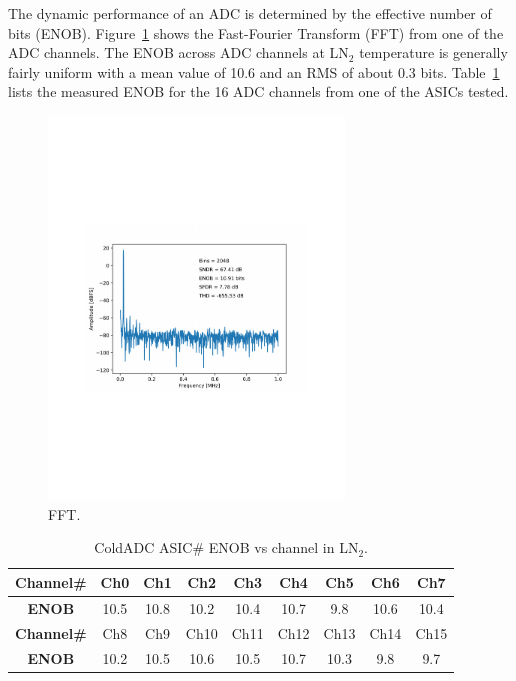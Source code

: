 \label{sec:4.3}


The dynamic performance of an ADC is determined by the effective number of bits (ENOB). Figure~\ref{fig:coldadc_fft} shows the Fast-Fourier Transform (FFT) from one of the ADC channels.  The ENOB across ADC channels at LN$_2$ temperature is generally fairly uniform with a mean value of 10.6 and an RMS of about 0.3 bits. Table~\ref{tab:adc_enob} lists the measured ENOB for the 16 ADC channels from one of the ASICs tested.
\begin{figure}[htb]
\centering
\begin{center}
\includegraphics[width=0.7\textwidth]{figures/fft_Sinusoid_20KHz_SE-SHA-ADC0_NomVREFPN_2M_v1.pdf}
\end{center}
\caption{FFT.}
\label{fig:coldadc_fft}
\end{figure}

\begin{table}[h]
\centering
\begin{tabular}{|c|c|c|c|c|c|c|c|c|}
\hline
\textbf{ Channel\# } & Ch0&Ch1&Ch2&Ch3 &Ch4 &Ch5 &Ch6 &Ch7 \\ \hline 
\textbf{ ENOB } & 10.5 & 10.8 & 10.2 & 10.4 & 10.7 & 9.8 & 10.6 & 10.4\\ \hline \hline
\textbf{ Channel\# } & Ch8&Ch9&Ch10&Ch11 &Ch12 &Ch13 &Ch14 &Ch15 \\ \hline
\textbf{ ENOB } & 10.2 & 10.5  & 10.6 & 10.5 & 10.7 & 10.3 & 9.8 & 9.7 \\ \hline
\end{tabular}
\caption{ColdADC ASIC\# ENOB vs channel in LN$_2$.}
\label{tab:adc_enob}
\end{table}


